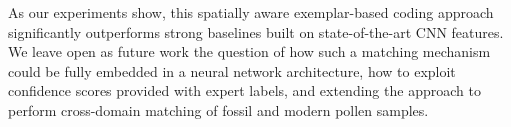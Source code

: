 \documentclass[10pt,twocolumn,letterpaper]{article}
\begin{document}
As our experiments show, this spatially aware exemplar-based coding approach
significantly outperforms strong baselines built on state-of-the-art CNN
features.  We leave open as future work the question of how such a matching
mechanism could be fully embedded in a neural network architecture,
how to exploit confidence scores provided with expert labels, and extending the
approach to perform cross-domain matching of fossil and modern pollen samples.







{\small


}
\end{document}

